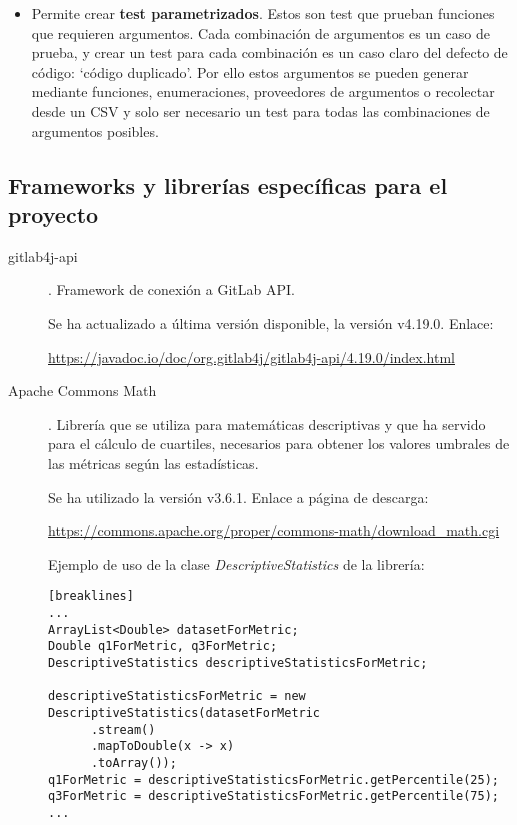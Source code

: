\begin{description}
\begin{itemize}
			\item Permite crear \textbf{test parametrizados}. Estos son test que prueban funciones que requieren argumentos. Cada combinación de argumentos es un caso de prueba, y crear un test para cada combinación es un caso claro del defecto de código: `código duplicado'. Por ello estos argumentos se pueden generar mediante funciones, enumeraciones, proveedores de argumentos o recolectar desde un CSV y solo ser necesario un test para todas las combinaciones de argumentos posibles.
		\end{itemize}
\end{description}
\subsection{Frameworks y librerías específicas para el proyecto}
\begin{description}
	\item[gitlab4j-api]. Framework de conexión a GitLab API. 
	
		Se ha actualizado a última versión disponible, la versión  v4.19.0. Enlace:
		
		\url{https://javadoc.io/doc/org.gitlab4j/gitlab4j-api/4.19.0/index.html}
		
		
	\item[Apache Commons Math]. Librería que se utiliza para matemáticas descriptivas y que ha servido para el cálculo de cuartiles, necesarios para obtener los valores umbrales de las métricas según las estadísticas. 
	
		Se ha utilizado la versión  v3.6.1. Enlace a página de descarga:
	
		\url{https://commons.apache.org/proper/commons-math/download_math.cgi}
		
		Ejemplo de uso de la clase \textit{DescriptiveStatistics} de la librería:
		
\begin{minipage}{\linewidth}
{\tiny 
\begin{verbatim}[breaklines]
...
ArrayList<Double> datasetForMetric;
Double q1ForMetric, q3ForMetric;
DescriptiveStatistics descriptiveStatisticsForMetric;

descriptiveStatisticsForMetric = new DescriptiveStatistics(datasetForMetric
	  .stream()
	  .mapToDouble(x -> x)
	  .toArray());
q1ForMetric = descriptiveStatisticsForMetric.getPercentile(25);
q3ForMetric = descriptiveStatisticsForMetric.getPercentile(75);
...
\end{verbatim}
}
\end{minipage}		

\end{description}
